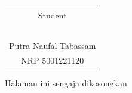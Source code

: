 \begin{center}
\begin{tabular}{c}
	\\
	\\
	Student\\
	\\
	\\
	\\
	\\
	\\
	Putra Naufal Tabassam \\
	NRP 5001221120\\
\end{tabular}
\end{center}

\newpage
\thispagestyle{empty}
\vspace*{\fill}
    \begin{center}
	Halaman ini sengaja dikosongkan
    \end{center}
\vspace*{\fill}
\pagebreak
